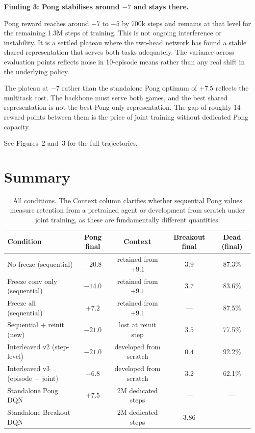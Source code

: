 \documentclass[11pt,a4paper]{article}
\begin{document}
\textbf{Finding 3: Pong stabilises around $-7$ and stays there.}

Pong reward reaches around $-7$ to $-5$ by 700k steps and remains at that level for the
remaining 1.3M steps of training. This is not ongoing interference or instability. It is a
settled plateau where the two-head network has found a stable shared representation that
serves both tasks adequately. The variance across evaluation points reflects noise in
10-episode means rather than any real shift in the underlying policy.

The plateau at $-7$ rather than the standalone Pong optimum of $+7.5$ reflects the
multitask cost. The backbone must serve both games, and the best shared representation is
not the best Pong-only representation. The gap of roughly 14 reward points between them
is the price of joint training without dedicated Pong capacity.

See Figures~2 and~3 for the full trajectories.

\section{Summary}

\begin{table}[h]
\centering\small
\begin{tabular}{lcccc}
\toprule
\textbf{Condition} & \textbf{Pong final} & \textbf{Context} & \textbf{Breakout final} & \textbf{Dead (final)} \\
\midrule
No freeze (sequential)           & $-20.8$ & retained from $+9.1$ & $3.9$  & 87.3\% \\
Freeze conv only (sequential)    & $-14.0$ & retained from $+9.1$ & $3.7$  & 83.6\% \\
Freeze all (sequential)          & $+7.2$  & retained from $+9.1$ & ---    & 87.5\% \\
Sequential + reinit (new)        & $-21.0$ & lost at reinit step  & $3.5$  & 77.5\% \\
Interleaved v2 (step-level)      & $-21.0$ & developed from scratch & $0.4$  & 92.2\% \\
Interleaved v3 (episode + joint) & $-6.8$  & developed from scratch & $3.2$  & 62.1\% \\
\midrule
Standalone Pong DQN              & $+7.5$  & 2M dedicated steps   & ---    & --- \\
Standalone Breakout DQN          & ---     & 2M dedicated steps   & $3.86$ & --- \\
\bottomrule
\end{tabular}
\caption{All conditions. The Context column clarifies whether sequential Pong values
measure retention from a pretrained agent or development from scratch under joint
training, as these are fundamentally different quantities.}
\end{table}
\end{document}
